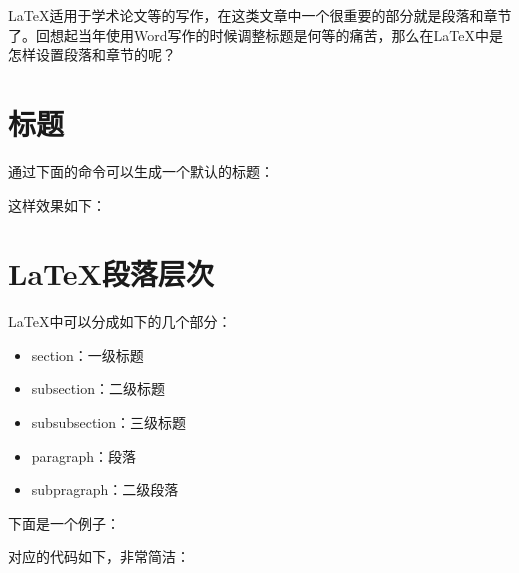 \documentclass[12pt]{article}
\begin{document}
\makeblogtitle

LaTeX适用于学术论文等的写作，在这类文章中一个很重要的部分就是段落和章节了。回想起当年使用Word写作的时候调整标题是何等的痛苦，那么在LaTeX中是怎样设置段落和章节的呢？

\section{标题}\label{ux6807ux9898}

通过下面的命令可以生成一个默认的标题：

\begin{Shaded}
\begin{Highlighting}[]

 
   
\end{Highlighting}
\end{Shaded}

这样效果如下：

\section{LaTeX段落层次}\label{latexux6bb5ux843dux5c42ux6b21}

LaTeX中可以分成如下的几个部分：

\begin{itemize}
\tightlist
\item
  section：一级标题
\item
  subsection：二级标题
\item
  subsubsection：三级标题
\item
  paragraph：段落
\item
  subpragraph：二级段落
\end{itemize}

下面是一个例子：

对应的代码如下，非常简洁：
\end{document}

